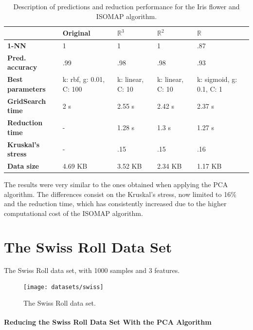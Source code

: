 \begin{table}[H]
	\centering
	
	\begin{tabular}{|p{.25\linewidth}|p{.15\linewidth}|p{.15\linewidth}|p{.15\linewidth}|p{.15\linewidth}|}
		\hline
		& \textbf{Original} & $\mathbb{R}^3$ & $\mathbb{R}^2$ & $\mathbb{R}$ \\\hline
		\textbf{1-NN} & 1 & 1 & 1 & .87 \\\hline
		\textbf{Pred. accuracy} & .99 & .98 & .98 & .93 \\\hline
		\textbf{Best parameters} & k: rbf, g: 0.01, C: 100 & k: linear, C: 10 & k: linear, C: 10 & k: sigmoid, g: 0.1, C: 1 \\\hline
		\textbf{GridSearch time} & 2 s & 2.55 s & 2.42 s & 2.37 s \\\hline
		\textbf{Reduction time} & - & 1.28 s & 1.3 s & 1.27 s \\\hline
		\textbf{Kruskal's stress} & - & .15 & .15 & .16 \\\hline
		\textbf{Data size} & 4.69 KB & 3.52 KB & 2.34 KB & 1.17 KB \\\hline
	\end{tabular}
	\captionsetup{justification=centering}
	\caption{Description of predictions and reduction performance for the Iris flower and ISOMAP algorithm.}
\end{table}

The results were very similar to the ones obtained when applying the PCA algorithm. The differences consist on the Kruskal's stress, now limited to 16\% and the reduction time, which has consistently increased due to the higher computational cost of the ISOMAP algorithm.

\clearpage
\section{The Swiss Roll Data Set}
\label{experiments:sr}

The Swiss Roll data set, with 1000 samples and 3 features.
\newline\newline

\begin{figure}[H]
	\centering
	\texttt{[image: datasets/swiss]}
	\captionsetup{justification=centering}
	\caption{The Swiss Roll data set.}
\end{figure}

\newpage
\paragraph{Reducing the Swiss Roll Data Set With the PCA Algorithm}

